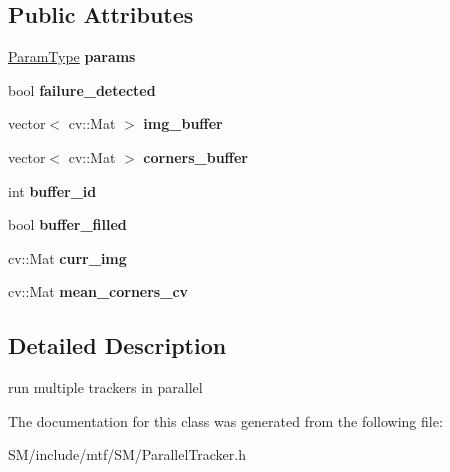 \subsection*{Public Attributes}
\begin{DoxyCompactItemize}
\item 
\hypertarget{classParallelTracker_a427bb70a8fd733e1163918c888de8117}{\hyperlink{structParallelParams}{Param\-Type} {\bfseries params}}\label{classParallelTracker_a427bb70a8fd733e1163918c888de8117}

\item 
\hypertarget{classParallelTracker_a15422685396f6c0f48efac669c4035b2}{bool {\bfseries failure\-\_\-detected}}\label{classParallelTracker_a15422685396f6c0f48efac669c4035b2}

\item 
\hypertarget{classParallelTracker_a3d9d3a66f219c9e6da179bd9405e0453}{vector$<$ cv\-::\-Mat $>$ {\bfseries img\-\_\-buffer}}\label{classParallelTracker_a3d9d3a66f219c9e6da179bd9405e0453}

\item 
\hypertarget{classParallelTracker_ae1f13883c63d32e333ab2c177a820814}{vector$<$ cv\-::\-Mat $>$ {\bfseries corners\-\_\-buffer}}\label{classParallelTracker_ae1f13883c63d32e333ab2c177a820814}

\item 
\hypertarget{classParallelTracker_a0a832ffbe352e025aba9d352c49f9850}{int {\bfseries buffer\-\_\-id}}\label{classParallelTracker_a0a832ffbe352e025aba9d352c49f9850}

\item 
\hypertarget{classParallelTracker_affdd3e6a92144e24e11ebb7db44d8989}{bool {\bfseries buffer\-\_\-filled}}\label{classParallelTracker_affdd3e6a92144e24e11ebb7db44d8989}

\item 
\hypertarget{classParallelTracker_a2d51cee1b967759c3d334b10512f6fb6}{cv\-::\-Mat {\bfseries curr\-\_\-img}}\label{classParallelTracker_a2d51cee1b967759c3d334b10512f6fb6}

\item 
\hypertarget{classParallelTracker_a901779fc572fac368c0040def888e587}{cv\-::\-Mat {\bfseries mean\-\_\-corners\-\_\-cv}}\label{classParallelTracker_a901779fc572fac368c0040def888e587}

\end{DoxyCompactItemize}


\subsection{Detailed Description}
run multiple trackers in parallel 

The documentation for this class was generated from the following file\-:\begin{DoxyCompactItemize}
\item 
S\-M/include/mtf/\-S\-M/Parallel\-Tracker.\-h\end{DoxyCompactItemize}
